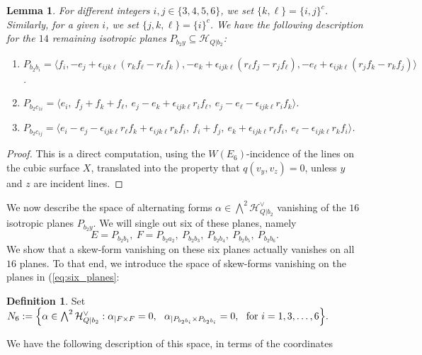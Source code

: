 \documentclass[11pt]{amsart}
\newtheorem{lemma}[theorem]{Lemma}
\theoremstyle{definition}
\newtheorem{definition}[theorem]{Definition}
\def\cH{\mathcal{H}}
\begin{document}
\begin{lemma}\label{lemma:16iso}
For different integers $i,j\in \{3,4,5,6\}$, we set $\{k,\ell\}=\{i,j\}^c$. Similarly, for a given $i$, we set $\{j,k, \ell\}=\{i\}^c$. We have the following description for the $14$ remaining isotropic planes $P_{b_2 y}\subseteq \cH_{Q|b_2}$:
\begin{enumerate}
\item $P_{b_2 b_i}=\bigl\langle f_i, -e_j+\epsilon_{ijk\ell}(r_kf_{\ell}-r_{\ell} f_k), -e_k+\epsilon_{ijk\ell}(r_{\ell} f_j-r_j f_{\ell}), -e_{\ell}+\epsilon_{ijk\ell}(r_jf_k-r_kf_j)\bigr\rangle$.
\item $P_{b_2 c_{1i}}=\bigl\langle e_i, \ f_j+f_k+f_{\ell}, \ e_j-e_k+\epsilon_{ijk\ell} r_i f_{\ell}, \ e_j-e_{\ell}-\epsilon_{ijk\ell}r_if_k\bigr\rangle$.
\item $P_{b_2 c_{ij}}=\bigl \langle e_i-e_j-\epsilon_{ijk\ell} r_{\ell}f_k+\epsilon_{ijk\ell} r_kf_i, \ f_i+f_j, \ e_k+\epsilon_{ijk\ell}r_{\ell}f_i, \ e_{\ell}-\epsilon_{ijk\ell} r_kf_i\bigr\rangle$.
\end{enumerate}
\end{lemma}
\begin{proof}
This is a direct computation, using the $W(E_6)$-incidence of the lines on the cubic surface $X$, translated into the property that $q(v_y, v_z)=0$, unless $y$ and $z$ are incident lines.    
\end{proof}

We now describe the space of alternating forms $\alpha \in \bigwedge^2 \cH_{Q|b_2}^{\vee}$ vanishing of the $16$ isotropic planes $P_{b_2 y}$. We will single out six of these planes, namely
\begin{equation}\label{eq:six_planes}
E=P_{b_2b_1}, \ F=P_{b_2a_2}, \ P_{b_2 b_3}, \ P_{b_2b_4}, \ P_{b_2b_5}, \ P_{b_2b_6}.
\end{equation}
We show that a skew-form vanishing on these six planes actually vanishes on all $16$ planes. To that end, we introduce the space of skew-forms vanishing on the planes in (\ref{eq:six_planes}:


\begin{definition}\label{def:N6}
Set $N_6:=\Bigl\{\alpha\in \bigwedge^2 \cH_{Q|b_2}^{\vee}: \alpha_{|F\times F}=0, \  \ \alpha_{|P_{b_2b_i}\times P_{b_2b_i}}=0, \ \mbox{ for } i=1, 3, \ldots, 6\Bigr\}.$
\end{definition}

We have the following description of this space, in terms of the coordinates 
\end{document}
